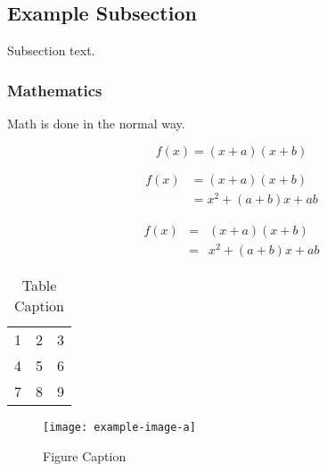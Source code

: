 \documentclass[
  preprint, %
  3p, %
  times, %
  11pt, %
  authoryear %
]{elsarticle}
\begin{document}
\subsection{Example Subsection}
\label{subsec1}

Subsection text.

\subsubsection{Mathematics}
Math is done in the normal way.

\begin{equation}
  f(x) = (x+a)(x+b)
\end{equation}

\begin{align}
  f(x) & = (x+a)(x+b)        \\
       & = x^2 + (a+b)x + ab
\end{align}

\begin{eqnarray}
  f(x) &=& (x+a)(x+b) \nonumber\\ %
  &=& x^2 + (a+b)x + ab
\end{eqnarray}



\begin{table}[t]%
  \centering%
  \begin{tabular}{l c r}%
    1 & 2 & 3 \\ %
    4 & 5 & 6 \\
    7 & 8 & 9 \\
  \end{tabular}
  \caption{Table Caption}\label{table1}
\end{table}


\begin{figure}[t]%
  \centering%
  \texttt{[image: example-image-a]}
  \caption{Figure Caption}\label{fig1}
\end{figure}
\end{document}
